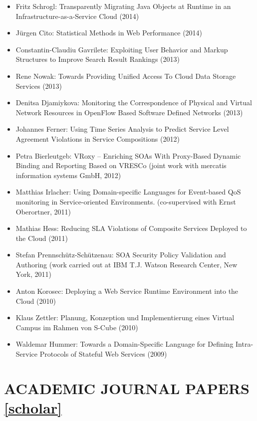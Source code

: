 \documentclass[paper=letter,fontsize=11pt]{scrartcl} %
\newcommand{\NewPart}[2]{\section*{\uppercase{#1} #2}}
\begin{document}
\begin{itemize}
  \item Fritz Schrogl: Transparently Migrating Java Objects at Runtime in an Infrastructure-as-a-Service Cloud (2014)
  \item J\"urgen Cito: Statistical Methods in Web Performance (2014)
  \item Constantin-Claudiu Gavrilete: Exploiting User Behavior and Markup Structures to Improve Search Result Rankings (2013)
  \item Rene Nowak: Towards Providing Unified Access To Cloud Data Storage Services (2013)
  \item Denitsa Djamiykova: Monitoring the Correspondence of Physical and Virtual Network Resources in OpenFlow Based Software Defined Networks (2013)
  \item Johannes Ferner:  Using Time Series Analysis to Predict Service Level Agreement Violations in Service Compositions (2012)
\item Petra Bierleutgeb:  VRoxy -- Enriching SOAs With Proxy-Based Dynamic
  Binding and Reporting Based on VRESCo (joint work with mercatis information systems GmbH, 2012)
  \item Matthias Irlacher: Using Domain-specific Languages for Event-based QoS monitoring in Service-oriented Environments. (co-supervised with Ernst Oberortner, 2011)
  \item Mathias Hess:  Reducing SLA Violations of Composite Services Deployed to the Cloud (2011)
  \item Stefan Prennsch\"utz-Sch\"utzenau:  SOA Security Policy Validation and
  Authoring (work carried out at IBM T.J. Watson Research Center, New York, 2011)
    \item Anton Korosec:  Deploying a Web Service Runtime Environment into the
  Cloud (2010)
  \item Klaus Zettler:  Planung, Konzeption und Implementierung eines Virtual
  Campus im Rahmen von S-Cube (2010)
  \item Waldemar Hummer:  Towards a Domain-Specific Language for Defining
  Intra-Service Protocols of Stateful Web Services (2009)
\end{itemize}

\newpage


\NewPart{Academic Journal Papers}{\href{https://scholar.google.ch/citations?user=wZ9f8CAAAAAJ}{[scholar]}}
\end{document}
